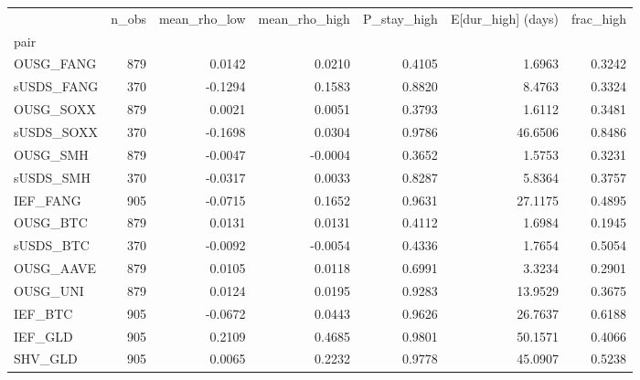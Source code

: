 \begin{tabular}{lrrrrrr}
\toprule
 & n\_obs & mean\_rho\_low & mean\_rho\_high & P\_stay\_high & E[dur\_high] (days) & frac\_high \\
pair &  &  &  &  &  &  \\
\midrule
OUSG\_FANG & 879 & 0.0142 & 0.0210 & 0.4105 & 1.6963 & 0.3242 \\
sUSDS\_FANG & 370 & -0.1294 & 0.1583 & 0.8820 & 8.4763 & 0.3324 \\
OUSG\_SOXX & 879 & 0.0021 & 0.0051 & 0.3793 & 1.6112 & 0.3481 \\
sUSDS\_SOXX & 370 & -0.1698 & 0.0304 & 0.9786 & 46.6506 & 0.8486 \\
OUSG\_SMH & 879 & -0.0047 & -0.0004 & 0.3652 & 1.5753 & 0.3231 \\
sUSDS\_SMH & 370 & -0.0317 & 0.0033 & 0.8287 & 5.8364 & 0.3757 \\
IEF\_FANG & 905 & -0.0715 & 0.1652 & 0.9631 & 27.1175 & 0.4895 \\
OUSG\_BTC & 879 & 0.0131 & 0.0131 & 0.4112 & 1.6984 & 0.1945 \\
sUSDS\_BTC & 370 & -0.0092 & -0.0054 & 0.4336 & 1.7654 & 0.5054 \\
OUSG\_AAVE & 879 & 0.0105 & 0.0118 & 0.6991 & 3.3234 & 0.2901 \\
OUSG\_UNI & 879 & 0.0124 & 0.0195 & 0.9283 & 13.9529 & 0.3675 \\
IEF\_BTC & 905 & -0.0672 & 0.0443 & 0.9626 & 26.7637 & 0.6188 \\
IEF\_GLD & 905 & 0.2109 & 0.4685 & 0.9801 & 50.1571 & 0.4066 \\
SHV\_GLD & 905 & 0.0065 & 0.2232 & 0.9778 & 45.0907 & 0.5238 \\
\bottomrule
\end{tabular}

